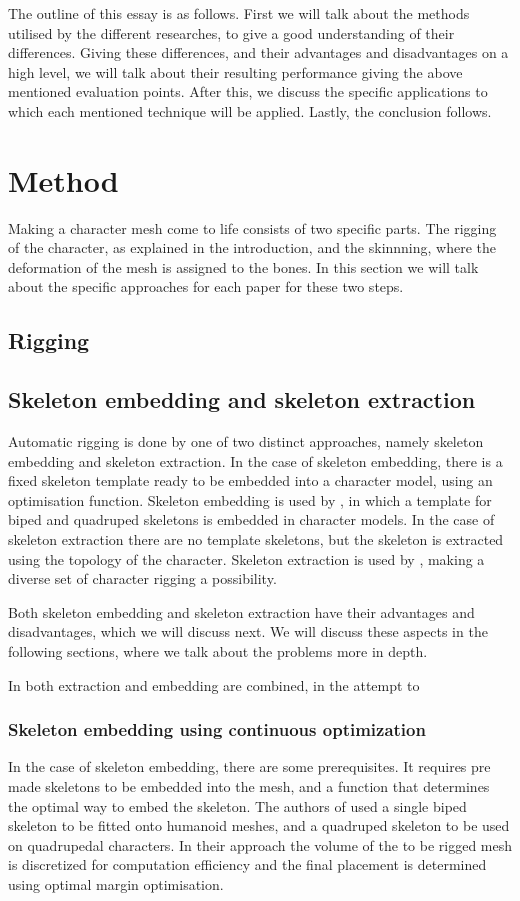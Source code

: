 \documentclass{article}
\begin{document}
The outline of this essay is as follows. First we will talk about the methods utilised by the different researches, to give a good understanding of their differences. Giving these differences, and their advantages and disadvantages on a high level, we will talk about their resulting performance giving the above mentioned evaluation points. After this, we discuss the specific applications to which each mentioned technique will be applied. Lastly, the conclusion follows.

\section{Method}
Making a character mesh come to life consists of two specific parts. The rigging of the character, as explained in the introduction, and the skinnning, where the deformation of the mesh is assigned to the bones. In this section we will talk about the specific approaches for each paper for these two steps.

\subsection{Rigging}
    \subsection{Skeleton embedding and skeleton extraction}
    Automatic rigging is done by one of two distinct approaches, namely skeleton embedding and skeleton extraction. In the case of skeleton embedding, there is a fixed skeleton template ready to be embedded into a character model, using an optimisation function. Skeleton embedding is used by \citep{paper1}, in which a template for biped and quadruped skeletons is embedded in character     models. In the case of skeleton extraction there are no template skeletons, but the skeleton is     extracted using the topology of the character. Skeleton extraction is used by \citep{paper2},        making a diverse set of character rigging a possibility.

    Both skeleton embedding and skeleton extraction have their advantages and disadvantages, which     we will discuss next. We will discuss these aspects in the following sections, where we talk     about the problems more in depth. 

    In \citep{paper3} both extraction and embedding are combined, in the attempt to    

\subsubsection{Skeleton embedding using continuous optimization}
 In the case of skeleton embedding, there are some prerequisites. It requires pre made skeletons to be embedded into the mesh, and a function that determines the optimal way to embed the skeleton. 
 The authors of \citep{paper1} used a single biped skeleton to be fitted onto humanoid meshes, and a quadruped skeleton to be used on quadrupedal characters. In their approach the volume of the to be rigged mesh is discretized for computation efficiency and the final placement is determined using optimal margin optimisation.
 
\end{document}
